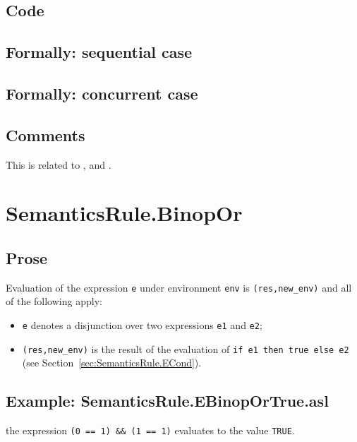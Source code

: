 \documentclass{book}
\begin{document}
  \subsection{Code}

\begin{emptyformal}
  \subsection{Formally: sequential case}

  \subsection{Formally: concurrent case}
\end{emptyformal}

  \subsection{Comments}
  This is related to ,  and .

\section{SemanticsRule.BinopOr \label{sec:SemanticsRule.BinopOr}}
  \subsection{Prose}
  Evaluation of the expression \texttt{e} under environment \texttt{env} is
  \texttt{(res,new\_env)} and all of the following apply:
  \begin{itemize}
  \item \texttt{e} denotes a disjunction over two expressions \texttt{e1} and \texttt{e2};
  \item \texttt{(res,new\_env)} is the result of the evaluation of \texttt{if
e1 then true else e2} (see Section~\ref{sec:SemanticsRule.ECond}).
  \end{itemize}

  \subsection{Example: SemanticsRule.EBinopOrTrue.asl}
    the expression \texttt{(0 == 1) \textbar\textbar \&\& (1 == 1)} evaluates to the value \texttt{TRUE}.
\end{document}
